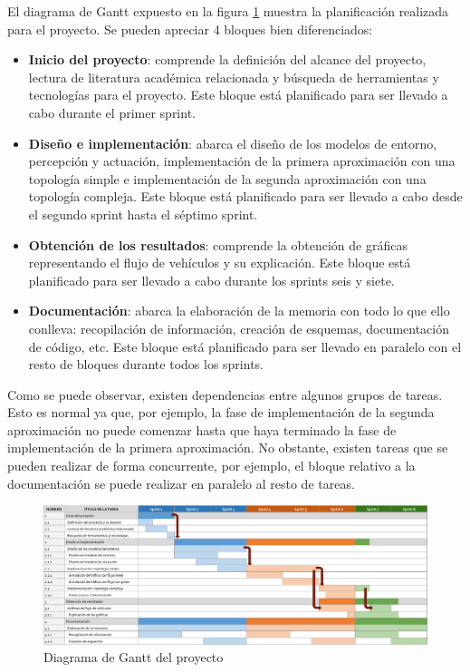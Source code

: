 El diagrama de Gantt expuesto en la figura \ref{fig:gantt} muestra la planificación realizada para el proyecto. Se pueden apreciar 4 bloques bien diferenciados:
\begin{itemize}
    \item \textbf{Inicio del proyecto}: comprende la definición del alcance del proyecto, lectura de literatura académica relacionada y búsqueda de herramientas y tecnologías para el proyecto. Este bloque está planificado para ser llevado a cabo durante el primer sprint.
    \item \textbf{Diseño e implementación}: abarca el diseño de los modelos de entorno, percepción y actuación, implementación de la primera aproximación con una topología simple e implementación de la segunda aproximación con una topología compleja. Este bloque está planificado para ser llevado a cabo desde el segundo sprint hasta el séptimo sprint.
    \item \textbf{Obtención de los resultados}: comprende la obtención de gráficas representando el flujo de vehículos y su explicación. Este bloque está planificado para ser llevado a cabo durante los sprints seis y siete.
    \item \textbf{Documentación}: abarca la elaboración de la memoria con todo lo que ello conlleva: recopilación de información, creación de esquemas, documentación de código, etc. Este bloque está planificado para ser llevado en paralelo con el resto de bloques durante todos los sprints.
\end{itemize}
Como se puede observar, existen dependencias entre algunos grupos de tareas. Esto es normal ya que, por ejemplo, la fase de implementación de la segunda aproximación no puede comenzar hasta que haya terminado la fase de implementación de la primera aproximación. No obstante, existen tareas que se pueden realizar de forma concurrente, por ejemplo, el bloque relativo a la documentación se puede realizar en paralelo al resto de tareas.
\begin{figure}[H]
    \centering
    \includegraphics[width=1\linewidth]{text/image/DGantt.pdf}
    \caption{Diagrama de Gantt del proyecto}
    \label{fig:gantt}
\end{figure}

